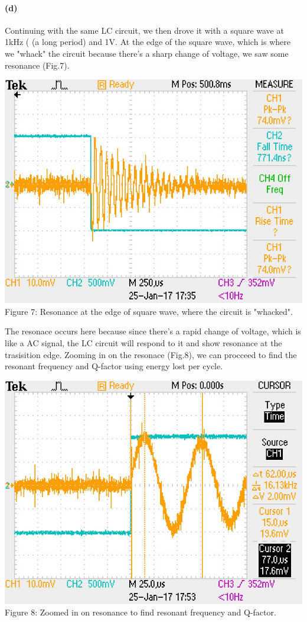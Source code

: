 \documentclass[]{article}
\begin{document}
	\paragraph{ (d)} 	
	Continuing with the same LC circuit, we then drove it with a square wave at 1kHz ( (a long period) and 1V. At the edge of the square wave, which is where we "whack" the circuit because there's a sharp change of voltage, we saw some resonance (Fig.7).
		\begin{center}
			\includegraphics[scale=0.8]{D_resonance}\\
			Figure 7: Resonance at the edge of square wave, where the circuit is "whacked".
		\end{center}
	The resonace occurs here because since there's a rapid change of voltage, which is like a AC signal, the LC circuit will respond to it and show resonance at the trasisition edge. Zooming in on the resonace (Fig.8), we can procceed to find the resonant frequency and Q-factor using energy lost per cycle.
	\begin{center}
		\includegraphics[scale=0.8]{D_qfactor}\\
		Figure 8: Zoomed in on resonance to find resonant frequency and Q-factor.
	\end{center}
\end{document}
